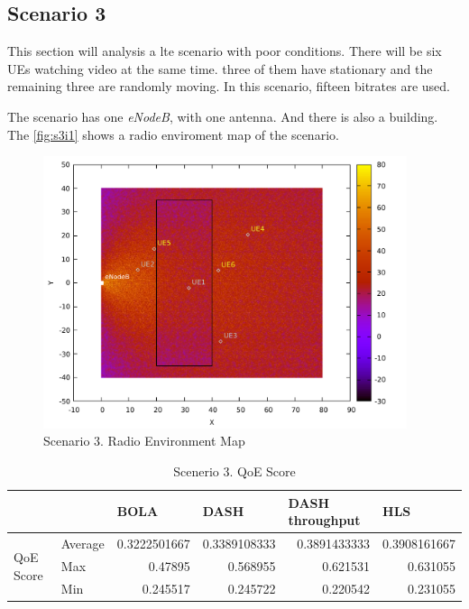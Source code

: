 \subsection{Scenario 3}

This section will analysis a lte scenario with poor conditions. There will be six UEs watching video at the same time.
three of them have stationary and the remaining three are randomly moving.
In this scenario, fifteen bitrates are used.

The scenario has one \textit{eNodeB}, with one antenna. And there is also a building. The 
\autoref{fig:s3i1} shows a radio enviroment map of the scenario.

\begin{figure}[h]
    \centering
    \includegraphics[width=0.95\textwidth]{img/s3i1.pdf}
    \caption{Scenario 3. Radio Environment Map}
    \label{fig:s3i1}
\end{figure}

\begin{table}[h]
    \begin{tabular}{@{}llrrrr@{}}
    \toprule
    &         & \multicolumn{1}{l}{BOLA} & \multicolumn{1}{l}{DASH} & \multicolumn{1}{l}{DASH throughput} & \multicolumn{1}{l}{HLS} \\ \midrule
    \multirow{3}{*}{QoE Score} & Average & 0.3222501667             & 0.3389108333             & 0.3891433333                        & 0.3908161667            \\
                               & Max     & 0.47895                  & 0.568955                 & 0.621531                            & 0.631055                \\
                               & Min     & 0.245517                 & 0.245722                 & 0.220542                            & 0.231055                \\ \bottomrule
    \end{tabular}
    \caption{Scenerio 3. QoE Score}
    \label{table:s3t1}
\end{table}

